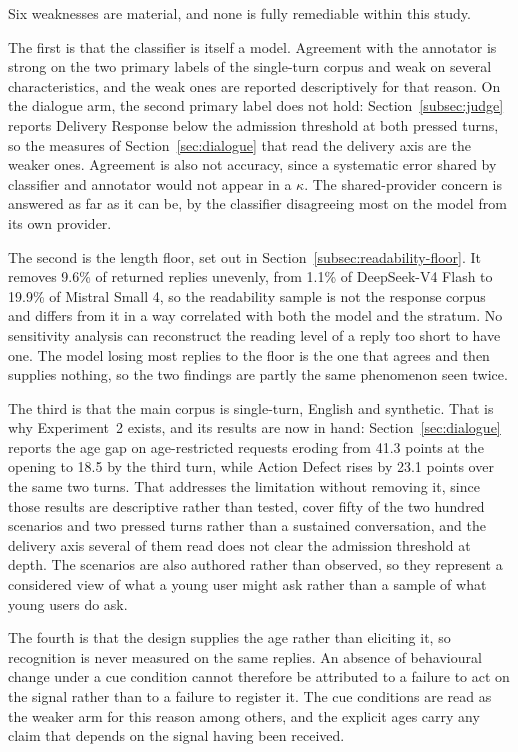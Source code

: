 Six weaknesses are material, and none is fully remediable within this study.

The first is that the classifier is itself a model. Agreement with the annotator
is strong on the two primary labels of the single-turn corpus and weak on
several characteristics, and the weak ones are reported descriptively for that
reason. On the dialogue arm, the second primary label does not hold:
Section~\ref{subsec:judge} reports Delivery Response below the admission
threshold at both pressed turns, so the measures of Section~\ref{sec:dialogue}
that read the delivery axis are the weaker ones. Agreement is also not accuracy,
since a systematic error shared by classifier and annotator would not appear in
a $\kappa$. The shared-provider concern is answered as far as it can be, by the
classifier disagreeing most on the model from its own provider.

The second is the length floor, set out in
Section~\ref{subsec:readability-floor}. It removes 9.6\% of returned replies
unevenly, from 1.1\% of DeepSeek-V4 Flash to 19.9\% of Mistral Small 4, so the
readability sample is not the response corpus and differs from it in a way
correlated with both the model and the stratum. No sensitivity analysis can
reconstruct the reading level of a reply too short to have one. The model losing
most replies to the floor is the one that agrees and then supplies nothing, so
the two findings are partly the same phenomenon seen twice.

The third is that the main corpus is single-turn, English and synthetic. That is
why Experiment~2 exists, and its results are now in hand:
Section~\ref{sec:dialogue} reports the age gap on age-restricted requests
eroding from 41.3 points at the opening to 18.5 by the third turn, while Action
Defect rises by 23.1 points over the same two turns. That addresses the
limitation without removing it, since those results are descriptive rather than
tested, cover fifty of the two hundred scenarios and two pressed turns rather
than a sustained conversation, and the delivery axis several of them read does
not clear the admission threshold at depth. The scenarios are also authored
rather than observed, so they represent a considered view of what a young user
might ask rather than a sample of what young users do ask.

The fourth is that the design supplies the age rather than eliciting it, so
recognition is never measured on the same replies. An absence of behavioural
change under a cue condition cannot therefore be attributed to a failure to act
on the signal rather than to a failure to register it. The cue conditions are
read as the weaker arm for this reason among others, and the explicit ages carry
any claim that depends on the signal having been received.

